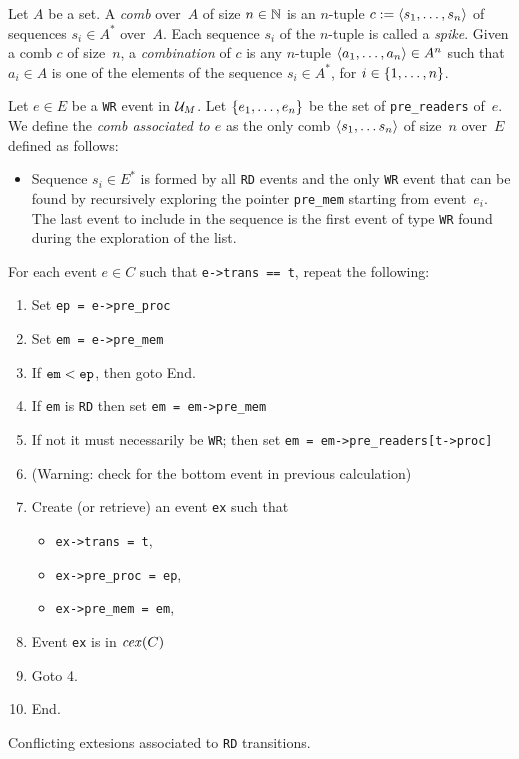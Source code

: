 \documentclass{llncs}
\begin{document}
Let $A$ be a set.
A \emph{comb} over~$A$ of size $n \in \mathbb{N}$ is an $n$-tuple
$c \mathrel{:=} \langle s_1, \ldots, s_n\rangle$ of sequences $s_i \in A^*$
over~$A$.
Each sequence $s_i$ of the $n$-tuple is called a \emph{spike}.
Given a comb $c$ of size~$n$,
a \emph{combination} of $c$ is any $n$-tuple $\langle a_1, \ldots, a_n\rangle \in A^n$
such that $a_i \in A$ is one of the elements of the sequence $s_i \in A^*$, for
$i \in {\{ 1, \ldots, n \mathclose \}}$.

Let $e \in E$ be a \verb!WR! event in $\mathcal{U}_{M}$.
Let ${\{ e_1, \ldots, e_n \mathclose \}}$ be the set of \verb!pre_readers! of~$e$.
We define the \emph{comb associated to $e$} as the only comb
$\langle s_1, \ldots s_n\rangle$ of size~$n$ over~$E$ defined as follows:
\begin{itemize}
\item
  Sequence $s_i \in E^*$ is formed by all \verb!RD! events and the only
  \verb!WR! event that can be found by recursively exploring the pointer
  \verb!pre_mem! starting from event~$e_i$. The last event to include in the
  sequence is the first event of type \verb!WR! found during the exploration of
  the list.
\end{itemize}


\begin{algorithm}
\noindent
For each event $e \in C$ such that \verb!e->trans == t!, repeat the following:
\begin{enumerate}
\item Set \verb!ep = e->pre_proc!
\item Set \verb!em = e->pre_mem!
\item If $\verb!em! < \verb!ep!$, then goto End.
\item If \verb!em! is \verb!RD! then set \verb!em = em->pre_mem!
\item If not it must necessarily be \verb!WR!; then set \verb!em = em->pre_readers[t->proc]!
\item (Warning: check for the bottom event in previous calculation)
\item
  Create (or retrieve) an event \verb!ex! such that
  \begin{itemize}
  \item \verb!ex->trans = t!,
  \item \verb!ex->pre_proc = ep!,
  \item \verb!ex->pre_mem = em!,
  \end{itemize}
\item Event \verb!ex! is in $\mathop{\mathit{cex}} (C)$
\item Goto 4.
\item End.
\end{enumerate}
\caption{Conflicting extesions associated to \texttt{RD} transitions.}
\label{a:cex_rd}
\end{algorithm}
\end{document}
